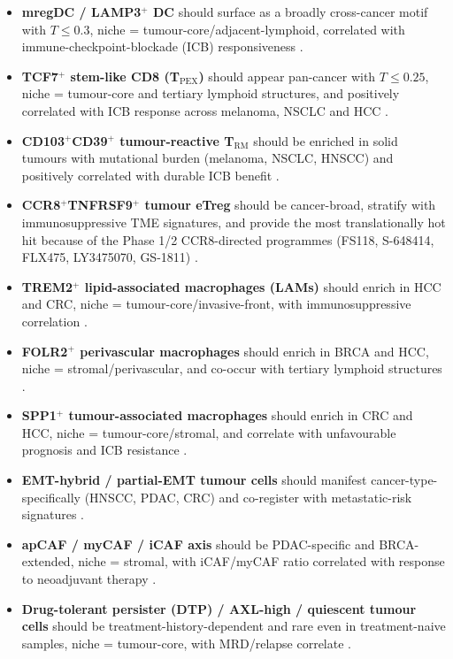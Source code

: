 \begin{itemize}[leftmargin=*,itemsep=2pt,topsep=2pt]
  \item \textbf{mregDC / LAMP3$^+$ DC} should surface as a broadly cross-cancer motif with $T \le 0.3$, niche = tumour-core/adjacent-lymphoid, correlated with immune-checkpoint-blockade (ICB) responsiveness \citep{Maier2020Nature,Cheng2021Cell}.
  \item \textbf{TCF7$^+$ stem-like CD8 (T$_\text{PEX}$)} should appear pan-cancer with $T \le 0.25$, niche = tumour-core and tertiary lymphoid structures, and positively correlated with ICB response across melanoma, NSCLC and HCC \citep{Miller2019NatImmunol,Siddiqui2019Immunity,Im2016Nature,Zheng2021ScienceTCell}.
  \item \textbf{CD103$^+$CD39$^+$ tumour-reactive T$_\text{RM}$} should be enriched in solid tumours with mutational burden (melanoma, NSCLC, HNSCC) and positively correlated with durable ICB benefit \citep{Duhen2018NatCommun,Savas2018NatMed,Oliveira2021Nature}.
  \item \textbf{CCR8$^+$TNFRSF9$^+$ tumour eTreg} should be cancer-broad, stratify with immunosuppressive TME signatures, and provide the most translationally hot hit because of the Phase 1/2 CCR8-directed programmes (FS118, S-648414, FLX475, LY3475070, GS-1811) \citep{Plitas2016Immunity,DeSimone2016Immunity,Wang2019Cell,VanDamme2021,Kidani2022PNAS}.
  \item \textbf{TREM2$^+$ lipid-associated macrophages (LAMs)} should enrich in HCC and CRC, niche = tumour-core/invasive-front, with immunosuppressive correlation \citep{Sharma2020Cell,Molgora2020Cell,Katzenelenbogen2020Cell}.
  \item \textbf{FOLR2$^+$ perivascular macrophages} should enrich in BRCA and HCC, niche = stromal/perivascular, and co-occur with tertiary lymphoid structures \citep{NalioRamos2022Cell,Bill2023Science,Mulder2021Immunity}.
  \item \textbf{SPP1$^+$ tumour-associated macrophages} should enrich in CRC and HCC, niche = tumour-core/stromal, and correlate with unfavourable prognosis and ICB resistance \citep{Zhang2020Cell}.
  \item \textbf{EMT-hybrid / partial-EMT tumour cells} should manifest cancer-type-specifically (HNSCC, PDAC, CRC) and co-register with metastatic-risk signatures \citep{Puram2017Cell,ChanSengYue2020NatGenet,Pastushenko2019TrendsCellBiol}.
  \item \textbf{apCAF / myCAF / iCAF axis} should be PDAC-specific and BRCA-extended, niche = stromal, with iCAF/myCAF ratio correlated with response to neoadjuvant therapy \citep{Elyada2019CancerDiscov,Cords2023NatCommun,Ohlund2017JEM}.
  \item \textbf{Drug-tolerant persister (DTP) / AXL-high / quiescent tumour cells} should be treatment-history-dependent and rare even in treatment-naive samples, niche = tumour-core, with MRD/relapse correlate \citep{Rambow2018Cell,Shen2020Cell,Oren2021Nature,Marine2020NatRevCancer}.
\end{itemize}


